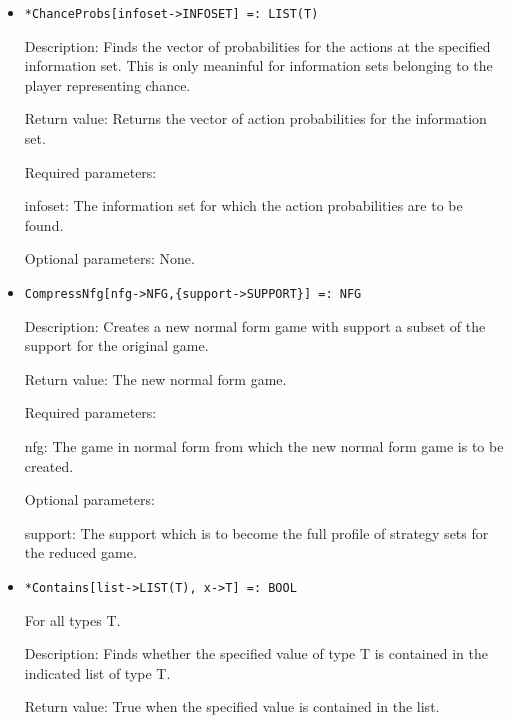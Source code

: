 \begin{itemize}
\item
\protect \large \begin{verbatim}
*ChanceProbs[infoset->INFOSET] =: LIST(T)
\end{verbatim}\normalsize

\bd
\item
[Description:] Finds the vector of probabilities for the actions at
the specified information set.  This is only meaninful for 
information sets belonging to the player representing chance.
\item
[Return value:] Returns the vector of action probabilities for the
information set.
\item
[Required parameters:]\hfil\null
	
\bd
\item
[infoset:] The information set for which the action probabilities are to
be found.
\ed

\item
[Optional parameters:] None.
\ed

\item
\protect \large \begin{verbatim}
CompressNfg[nfg->NFG,{support->SUPPORT}] =: NFG
\end{verbatim}\normalsize

\bd
\item
[Description:] Creates a new normal form game with support a subset of
the support for the original game.  
\item
[Return value:] The new normal form game.
\item
[Required parameters:]\hfil\null
	
\bd
\item
[nfg:] The game in normal form from which the new normal form game
is to be created.
\ed

\item  
[Optional parameters:]\hfill\null
\bd
\item
[support:] The support which is to become the full profile of strategy
sets for the reduced game.   
\ed
\ed

\item
\protect \large \begin{verbatim}
*Contains[list->LIST(T), x->T] =: BOOL
\end{verbatim}\normalsize

For all types T.

\bd
\item[Description:] Finds whether the specified value of type T is
contained in the indicated list of type T.
\item[Return value:] True when the specified value is contained in the
list.


\end{itemize}
